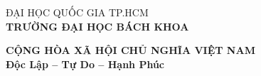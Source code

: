\documentclass[12pt,a4paper,oneside]{extbook}
\begin{document}

\coverpage
\thispagestyle{empty}
\enlargethispage*{5cm}
\vspace*{-1.5cm}

\noindent
{\footnotesize
\begin{minipage}[t]{0.45\textwidth}
    \centering
    ĐẠI HỌC QUỐC GIA TP.HCM \\
    \textbf{TRƯỜNG ĐẠI HỌC BÁCH KHOA}
\end{minipage}%
\hfill
\begin{minipage}[t]{0.55\textwidth}
    \centering
    \textbf{CỘNG HÒA XÃ HỘI CHỦ NGHĨA VIỆT NAM} \\
    \textbf{Độc Lập -- Tự Do -- Hạnh Phúc}
\end{minipage}
}

\vspace{0.1cm}
\end{document}
